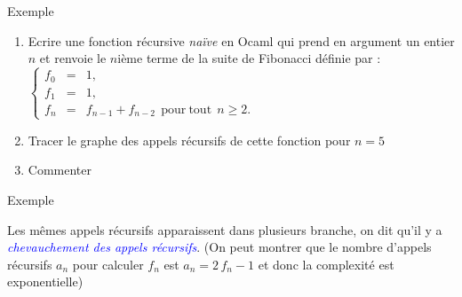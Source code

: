 \documentclass[10pt]{beamer}
\begin{document}
\begin{frame}{\Ctitle}{\stitle}
	\begin{exampleblock}{Exemple}
		\begin{enumerate}
			\item<1-> Ecrire une fonction récursive \textit{naïve} en Ocaml qui prend en argument un entier $n$ et renvoie le $n$ième terme de la suite de Fibonacci définie par :
				$\left\{ \begin{array}{lll}
						f_0   & = & 1,                                                  \\
						f_1   & = & 1,                                                  \\
						f_{n} & = & f_{n-1}+f_{n-2} \mathrm{\ \ pour\ tout\ \ } n\geq2.\end{array} \right.$
					\onslide<2->{\inputpartOCaml{\SPATH/fibo.ml}{}{}{1}{2}}
			\item<3-> Tracer le graphe des appels récursifs de cette fonction pour $n=5$
			\item<4-> Commenter
		\end{enumerate}
	\end{exampleblock}
\end{frame}



\begin{frame}{\Ctitle}{\stitle}
	\begin{exampleblock}{Exemple}
		\begin{center}
		\end{center}
		 Les mêmes appels récursifs apparaissent dans plusieurs branche, on dit qu'il y a \textcolor{blue}{\textit{chevauchement des appels récursifs}}.
		\onslide<3-> (On peut montrer que le nombre d'appels récursifs $a_n$ pour calculer $f_n$ est $a_n = 2\,f_n -1$ et donc la complexité est exponentielle)
	\end{exampleblock}
\end{frame}
\end{document}

